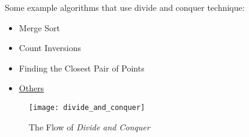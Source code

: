 \documentclass[12pt]{article}
\begin{document}
Some example algorithms that use divide and conquer technique: 
\begin{itemize}
	\item Merge Sort
	\item Count Inversions
	\item Finding the Closest Pair of Points 
	\item \href{https://www.geeksforgeeks.org/divide-and-conquer/}{Others}
\end{itemize}	

\begin{figure}[h]
	\centering
	\texttt{[image: divide\_and\_conquer]}
	\caption{The Flow of \textit{Divide and Conquer}}
	\label{fig:divide_and_conquer}
\end{figure}
\end{document}
